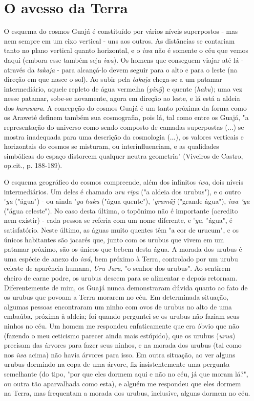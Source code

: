 \section{O avesso da Terra}

O esquema do cosmos Guajá é constituído por vários níveis superpostos -
mas nem sempre em um eixo vertical - uns aos outros. As distâncias se
contariam tanto no plano vertical quanto horizontal, e o \emph{iwa} não
é somente o céu que vemos daqui (embora esse também seja \emph{iwa}). Os
homens que conseguem viajar até lá - através da \emph{takaja} - para
alcançá-lo devem seguir para o alto e para o leste (na direção em que
nasce o sol). Ao subir pela \emph{takaja} chega-se a um patamar
intermediário, aquele repleto de água vermelha (\emph{pinỹ}) e quente
(\emph{haku}); uma vez nesse patamar, sobe-se novamente, agora em
direção ao leste, e lá está a aldeia dos \emph{karawara}. A concepção do
cosmos Guajá é um tanto próxima da forma como os Araweté definem também
sua cosmografia, pois lá, tal como entre os Guajá, "a representação do
universo como sendo composto de camadas superpostas (...) se mostra
inadequada para uma descrição da cosmologia (...), os valores verticais
e horizontais do cosmos se misturam, ou interinfluenciam, e as
qualidades simbólicas do espaço distorcem qualquer neutra geometria"
(Viveiros de Castro, op.cit., p. 188-189).

O esquema geográfico do cosmos compreende, além dos infinitos
\emph{iwa}, dois níveis intermediários. Um deles é chamado \emph{uru
ripa} ("a aldeia dos urubus"), e o outro '\emph{ya} ("água") - ou ainda
'\emph{ya haku} ("água quente"), '\emph{yramãj} ("grande água"),
\emph{iwa 'ya} ("água celeste"). No caso desta última, o topônimo não é
importante (acredito nem existir) - cada pessoa se referia com um nome
diferente, e '\emph{ya}, "água", é satisfatório. Neste último, as águas
muito quentes têm "a cor de urucum", e os únicos habitantes são jacarés
que, junto com os urubus que vivem em um patamar próximo, são os únicos
que bebem desta água. A morada dos urubus é uma espécie de anexo do
\emph{iwá}, bem próximo à Terra, controlado por um urubu celeste de
aparência humana, \emph{Uru Jara}, "o senhor dos urubus". Ao sentirem
cheiro de carne podre, os urubus descem para se alimentar e depois
retornam. Diferentemente de mim, os Guajá nunca demonstraram dúvida
quanto ao fato de os urubus que povoam a Terra morarem no céu. Em
determinada situação, algumas pessoas encontraram um ninho com ovos de
urubus no alto de uma embaúba, próxima à aldeia; foi quando perguntei se
os urubus não faziam seus ninhos no céu. Um homem me respondeu
enfaticamente que era óbvio que não (fazendo o meu ceticismo parecer
ainda mais estúpido), que os urubus (\emph{urua}) precisam das árvores
para fazer seus ninhos, e na morada dos urubus (tal como nos \emph{iwa}
acima) não havia árvores para isso. Em outra situação, ao ver alguns
urubus dormindo na copa de uma árvore, fiz insistentemente uma pergunta
semelhante (do tipo, "por que eles dormem aqui e não no céu, já que
moram lá?", ou outra tão aparvalhada como esta), e alguém me respondeu
que eles dormem na Terra, mas frequentam a morada dos urubus, inclusive,
alguns dormem no céu.

